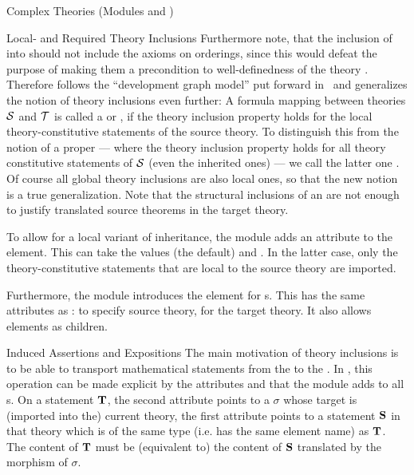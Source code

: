 \begin{tchapter}[id=complex-theories,short=Complex Theories]{Complex Theories (Modules
    {} and {})}
\begin{tsection}[id=restricting-inference,short=Local/Required Theory Inclusions]{Local- and Required Theory Inclusions}
Furthermore note, that the inclusion of {} into {}
should not include the {} axioms on orderings, since this would defeat the
purpose of making them a precondition to well-definedness of the theory
{}. Therefore {\omdoc} follows the ``development graph model'' put
forward in~\cite{Hutter:mocsv00} and generalizes the notion of theory inclusions even
further: A formula mapping between theories ${\cal S}$ and ${\cal T}$ is called a
{} or {}, if the theory
inclusion property holds for the local theory-constitutive statements of the source
theory.  To distinguish this from the notion of a proper {} ---
where the theory inclusion property holds for all theory constitutive statements of ${\cal S}$
(even the inherited ones) --- we call the latter one {}. Of course all
global theory inclusions are also local ones, so that the new notion is a true
generalization. Note that the structural inclusions of an {} are
not enough to justify translated source theorems in the target theory.

To allow for a local variant of inheritance, the {} module adds an
attribute {} to the {} element. This can take
the values {} (the default) and
{}. In the latter case, only the theory-constitutive
statements that are local to the source theory are imported.
  
Furthermore, the {} module introduces the {}
element for {s}. This has the same attributes as
{}: {} to specify source
theory, {} for the target theory. It also allows
{} elements as children.
\end{tsection}

\begin{tsection}[id=induced-assertions,short=Induced Assertions]{Induced Assertions and Expositions}
  The main motivation of theory inclusions is to be able to transport mathematical
  statements from the {} to the {}. In
  {\omdoc}, this operation can be made explicit by the attributes
  {} and {} that the module
  {} adds to all {s}.  On a statement
  ${\bf T}$, the second attribute points to a {} $\sigma$ whose
  target is (imported into the) current theory, the first attribute points to a statement
  ${\bf S}$ in that theory which is of the same type (i.e. has the same {\omdoc} element name)
  as ${\bf T}$.  The content of ${\bf T}$ must be (equivalent to) the content of ${\bf S}$ translated
  by the morphism of $\sigma$.
  

\end{tsection}
\end{tchapter}

